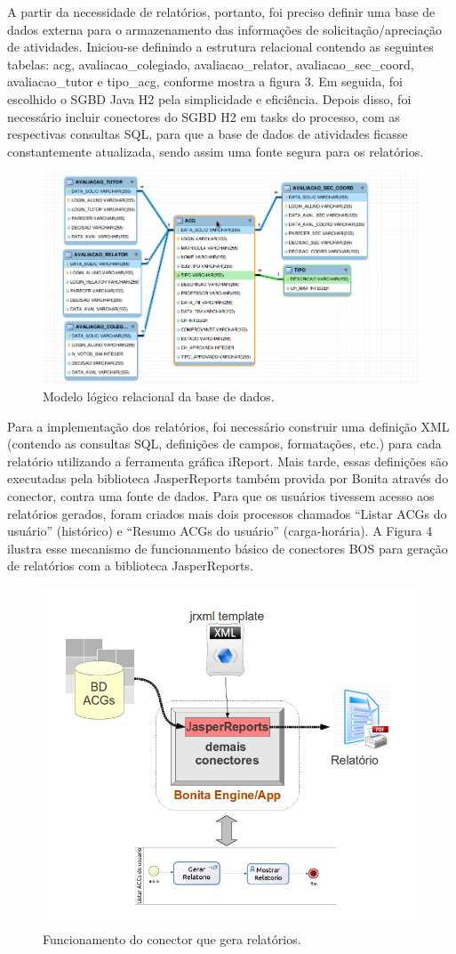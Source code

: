 \documentclass[12pt]{article}
\begin{document}
A partir da necessidade de relatórios, portanto, foi preciso definir uma base de dados externa para o armazenamento das informações de solicitação/apreciação de atividades. Iniciou-se definindo a estrutura relacional contendo as seguintes tabelas: acg, avaliacao\_colegiado, avaliacao\_relator, avaliacao\_sec\_coord, avaliacao\_tutor e tipo\_acg, conforme mostra a figura 3. Em seguida, foi escolhido o SGBD Java H2 pela simplicidade e eficiência. Depois disso, foi necessário incluir conectores do SGBD H2 em tasks do processo, com as respectivas consultas SQL, para que a base de dados de atividades ficasse constantemente atualizada, sendo assim uma fonte segura para os relatórios.

\begin{figure}[ht]
\centering
\includegraphics[width=.8\textwidth]{images/bancoLogico.png}
\caption{Modelo lógico relacional da base de dados.}
\label{fig:Fig3}
\end{figure}

Para a implementação dos relatórios, foi necessário construir uma definição XML (contendo as consultas SQL, definições de campos, formatações, etc.)  para cada relatório utilizando a ferramenta gráfica iReport. Mais tarde, essas definições são executadas pela biblioteca JasperReports também provida por Bonita através do conector, contra uma fonte de dados. Para que os usuários tivessem acesso aos relatórios gerados, foram criados mais dois processos chamados “Listar ACGs do usuário” (histórico) e “Resumo ACGs do usuário” (carga-horária). A Figura 4 ilustra esse mecanismo de funcionamento básico de conectores BOS para geração de relatórios com a biblioteca JasperReports.

\begin{figure}[ht]
\centering
\includegraphics[width=.5\textwidth]{images/conector.png}
\caption{Funcionamento do conector que gera relatórios.}
\label{fig:Fig4}
\end{figure}
\end{document}
